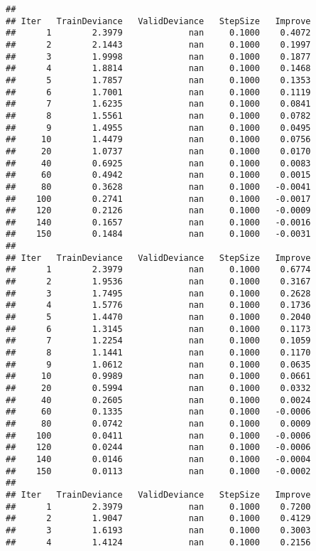 \documentclass[]{article}
\begin{document}
\begin{verbatim}
## 
## Iter   TrainDeviance   ValidDeviance   StepSize   Improve
##      1        2.3979             nan     0.1000    0.4072
##      2        2.1443             nan     0.1000    0.1997
##      3        1.9998             nan     0.1000    0.1877
##      4        1.8814             nan     0.1000    0.1468
##      5        1.7857             nan     0.1000    0.1353
##      6        1.7001             nan     0.1000    0.1119
##      7        1.6235             nan     0.1000    0.0841
##      8        1.5561             nan     0.1000    0.0782
##      9        1.4955             nan     0.1000    0.0495
##     10        1.4479             nan     0.1000    0.0756
##     20        1.0737             nan     0.1000    0.0170
##     40        0.6925             nan     0.1000    0.0083
##     60        0.4942             nan     0.1000    0.0015
##     80        0.3628             nan     0.1000   -0.0041
##    100        0.2741             nan     0.1000   -0.0017
##    120        0.2126             nan     0.1000   -0.0009
##    140        0.1657             nan     0.1000   -0.0016
##    150        0.1484             nan     0.1000   -0.0031
## 
## Iter   TrainDeviance   ValidDeviance   StepSize   Improve
##      1        2.3979             nan     0.1000    0.6774
##      2        1.9536             nan     0.1000    0.3167
##      3        1.7495             nan     0.1000    0.2628
##      4        1.5776             nan     0.1000    0.1736
##      5        1.4470             nan     0.1000    0.2040
##      6        1.3145             nan     0.1000    0.1173
##      7        1.2254             nan     0.1000    0.1059
##      8        1.1441             nan     0.1000    0.1170
##      9        1.0612             nan     0.1000    0.0635
##     10        0.9989             nan     0.1000    0.0661
##     20        0.5994             nan     0.1000    0.0332
##     40        0.2605             nan     0.1000    0.0024
##     60        0.1335             nan     0.1000   -0.0006
##     80        0.0742             nan     0.1000    0.0009
##    100        0.0411             nan     0.1000   -0.0006
##    120        0.0244             nan     0.1000   -0.0006
##    140        0.0146             nan     0.1000   -0.0004
##    150        0.0113             nan     0.1000   -0.0002
## 
## Iter   TrainDeviance   ValidDeviance   StepSize   Improve
##      1        2.3979             nan     0.1000    0.7200
##      2        1.9047             nan     0.1000    0.4129
##      3        1.6193             nan     0.1000    0.3003
##      4        1.4124             nan     0.1000    0.2156

\end{verbatim}
\end{document}
